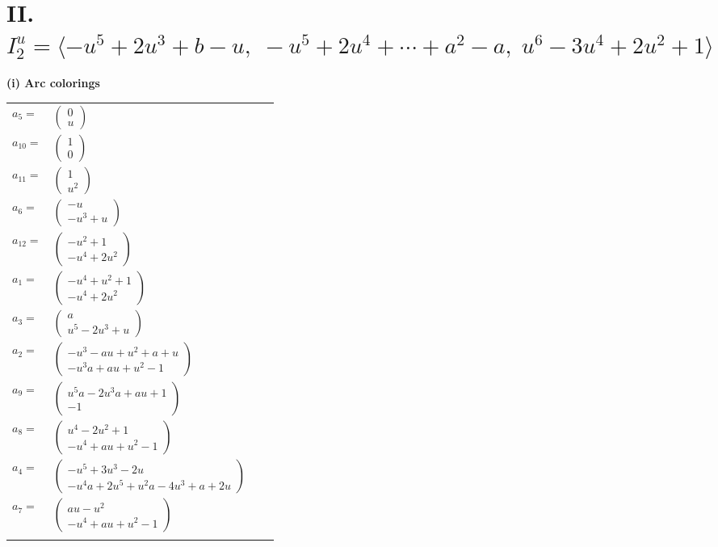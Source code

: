 \documentclass[1p]{elsarticle_modified}
\theoremstyle{definition}
\begin{document}
\centering \section*{II. $I^u_{2}= \langle - u^5+2 u^3+b- u,\;- u^5+2 u^4+\cdots+a^2- a,\;u^6-3 u^4+2 u^2+1 \rangle$}
\flushleft \textbf{(i) Arc colorings}\\
\begin{tabular}{m{7pt} m{180pt} m{7pt} m{180pt} }
\flushright $a_{5}=$&$\begin{pmatrix}0\\u\end{pmatrix}$ \\
\flushright $a_{10}=$&$\begin{pmatrix}1\\0\end{pmatrix}$ \\
\flushright $a_{11}=$&$\begin{pmatrix}1\\u^2\end{pmatrix}$ \\
\flushright $a_{6}=$&$\begin{pmatrix}- u\\- u^3+u\end{pmatrix}$ \\
\flushright $a_{12}=$&$\begin{pmatrix}- u^2+1\\- u^4+2 u^2\end{pmatrix}$ \\
\flushright $a_{1}=$&$\begin{pmatrix}- u^4+u^2+1\\- u^4+2 u^2\end{pmatrix}$ \\
\flushright $a_{3}=$&$\begin{pmatrix}a\\u^5-2 u^3+u\end{pmatrix}$ \\
\flushright $a_{2}=$&$\begin{pmatrix}- u^3- a u+u^2+a+u\\- u^3 a+a u+u^2-1\end{pmatrix}$ \\
\flushright $a_{9}=$&$\begin{pmatrix}u^5 a-2 u^3 a+a u+1\\-1\end{pmatrix}$ \\
\flushright $a_{8}=$&$\begin{pmatrix}u^4-2 u^2+1\\- u^4+a u+u^2-1\end{pmatrix}$ \\
\flushright $a_{4}=$&$\begin{pmatrix}- u^5+3 u^3-2 u\\- u^4 a+2 u^5+u^2 a-4 u^3+a+2 u\end{pmatrix}$ \\
\flushright $a_{7}=$&$\begin{pmatrix}a u- u^2\\- u^4+a u+u^2-1\end{pmatrix}$\\&\end{tabular}
\end{document}
